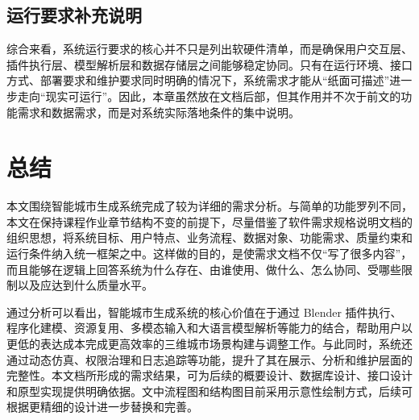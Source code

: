 \documentclass[UTF8,a4paper,10pt]{ctexart}
\begin{document}
\subsection{运行要求补充说明}
综合来看，系统运行要求的核心并不只是列出软硬件清单，而是确保用户交互层、插件执行层、模型解析层和数据存储层之间能够稳定协同。只有在运行环境、接口方式、部署要求和维护要求同时明确的情况下，系统需求才能从“纸面可描述”进一步走向“现实可运行”。因此，本章虽然放在文档后部，但其作用并不次于前文的功能需求和数据需求，而是对系统实际落地条件的集中说明。

\section{总结}
本文围绕智能城市生成系统完成了较为详细的需求分析。与简单的功能罗列不同，本文在保持课程作业章节结构不变的前提下，尽量借鉴了软件需求规格说明文档的组织思想，将系统目标、用户特点、业务流程、数据对象、功能需求、质量约束和运行条件纳入统一框架之中。这样做的目的，是使需求文档不仅“写了很多内容”，而且能够在逻辑上回答系统为什么存在、由谁使用、做什么、怎么协同、受哪些限制以及应达到什么质量水平。

通过分析可以看出，智能城市生成系统的核心价值在于通过 Blender 插件执行、程序化建模、资源复用、多模态输入和大语言模型解析等能力的结合，帮助用户以更低的表达成本完成更高效率的三维城市场景构建与调整工作。与此同时，系统还通过动态仿真、权限治理和日志追踪等功能，提升了其在展示、分析和维护层面的完整性。本文档所形成的需求结果，可为后续的概要设计、数据库设计、接口设计和原型实现提供明确依据。文中流程图和结构图目前采用示意性绘制方式，后续可根据更精细的设计进一步替换和完善。
\end{document}
